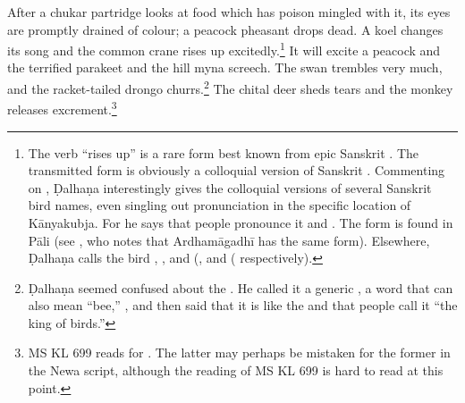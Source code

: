 \begin{translation}

After a chukar partridge %
looks at food which has poison mingled with it, its eyes are promptly drained of
colour; a peacock pheasant %
drops dead.  A koel %
changes its song and the common crane %
rises up excitedly.\footnote{The verb  “rises up” is a rare form
best known from epic Sanskrit \citep[see][212, \S 7.6.1]{ober-2003}.   The
transmitted form  is obviously a colloquial version of Sanskrit
.  Commenting on , Ḍalhaṇa interestingly gives the
colloquial versions of several Sanskrit bird names, even singling out
pronunciation in the specific location of Kānyakubja.  For  he says
that people pronounce it  and .  The form 
is found in Pāli (see \cite[731]{cone-dict}, who notes that Ardhamāgadhī has the
same form). Elsewhere, Ḍalhaṇa calls the bird ,  , and 
(,  and
( respectively).}  It will excite a peacock 
and the terrified parakeet %
and the hill myna %
screech. The swan %
trembles very much, and the racket-tailed drongo %
churrs.\footnote{Ḍalhaṇa seemed confused about the .  He called it a generic , a word that can also mean 
“bee,” \citep[62]{dave}, and then said that it is like the
 \citep[for a nice explanation of this name,
see][62--63]{dave} and that people call it “the king of birds.”} The chital deer
sheds tears and the
monkey releases excrement.\footnote{MS KL 699 reads  for
.  The latter may perhaps be mistaken for the former in
the Newa script, although the reading of MS KL 699 is hard to read at this point.}


\end{translation}
